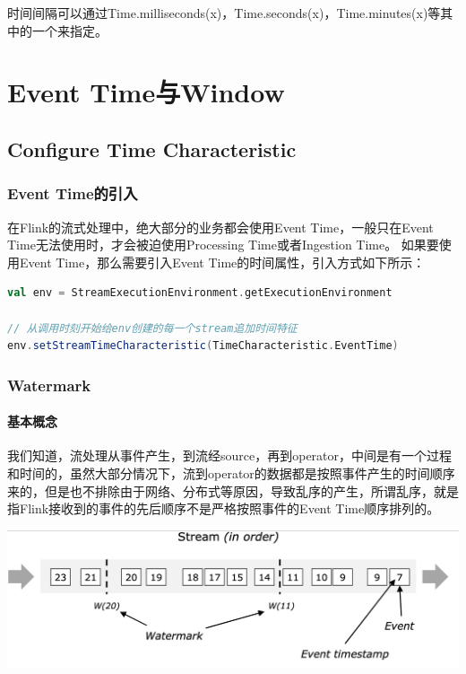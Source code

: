 \documentclass[oneside]{ctexbook}
\begin{document}
时间间隔可以通过Time.milliseconds(x)，Time.seconds(x)，Time.minutes(x)等其中的一个来指定。

\chapter{Event Time与Window}

\section{Configure Time Characteristic}

\subsection{Event Time的引入}

在Flink的流式处理中，绝大部分的业务都会使用Event Time，一般只在Event Time无法使用时，才会被迫使用Processing Time或者Ingestion Time。
如果要使用Event Time，那么需要引入Event Time的时间属性，引入方式如下所示：

\begin{lstlisting}[language=scala]
val env = StreamExecutionEnvironment.getExecutionEnvironment
 
// 从调用时刻开始给env创建的每一个stream追加时间特征
env.setStreamTimeCharacteristic(TimeCharacteristic.EventTime)
\end{lstlisting}

\subsection{Watermark}

\subsubsection{基本概念}

我们知道，流处理从事件产生，到流经source，再到operator，中间是有一个过程和时间的，虽然大部分情况下，流到operator的数据都是按照事件产生的时间顺序来的，但是也不排除由于网络、分布式等原因，导致乱序的产生，所谓乱序，就是指Flink接收到的事件的先后顺序不是严格按照事件的Event Time顺序排列的。

\noindent \includegraphics[width=\textwidth]{stream_watermark_in_order.png}
\end{document}
